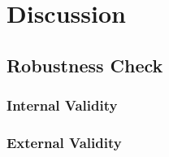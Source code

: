 \chapter{Discussion\label{ch:disc}}

\section{Robustness Check}

\subsection{Internal Validity}

\subsection{External Validity}